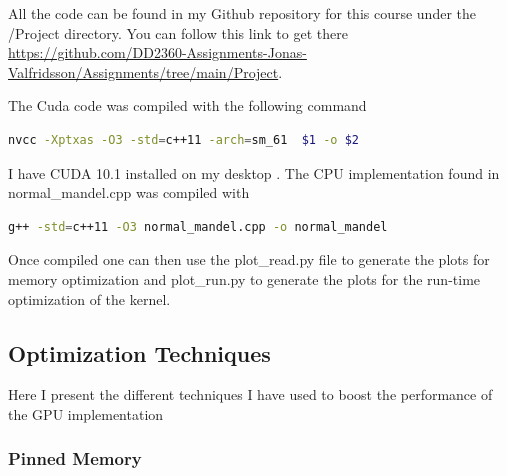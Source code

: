 \documentclass{article}
\begin{document}
All the code can be found in my Github repository for this course under the /Project
directory. You can follow this link to get there
\href{https://github.com/DD2360-Assignments-Jonas-Valfridsson/Assignments/tree/main/Project}{https://github.com/DD2360-Assignments-Jonas-Valfridsson/Assignments/tree/main/Project}.

The Cuda code was compiled with the following command

\begin{mdframed}[backgroundcolor=codeColor,leftmargin=0.0cm,hidealllines=true,%
  innerleftmargin=0.1cm,innerrightmargin=0.1cm,innertopmargin=0.5cm,innerbottommargin=0.10cm,
  roundcorner=15pt]
\begin{lstlisting}[language=bash]
  nvcc -Xptxas -O3 -std=c++11 -arch=sm_61  $1 -o $2 
\end{lstlisting}
\end{mdframed}

I have CUDA 10.1 installed on my desktop \cite{cuda-version}. The CPU implementation found in
normal\_mandel.cpp was compiled with 

\begin{mdframed}[backgroundcolor=codeColor,leftmargin=0.0cm,hidealllines=true,%
  innerleftmargin=0.1cm,innerrightmargin=0.1cm,innertopmargin=0.5cm,innerbottommargin=0.10cm,
  roundcorner=15pt]
\begin{lstlisting}[language=bash]
  g++ -std=c++11 -O3 normal_mandel.cpp -o normal_mandel
\end{lstlisting}
\end{mdframed}


Once compiled one can then use the plot\_read.py file to generate the plots for memory optimization and
plot\_run.py to generate the plots for the run-time optimization of the kernel. 





\subsection{Optimization Techniques}%
\label{sub:optimization_techniques}

Here I present the different techniques I have used to boost the performance of the GPU
implementation

\subsubsection{Pinned Memory}%
\label{ssub:pinned_memory}
\end{document}
